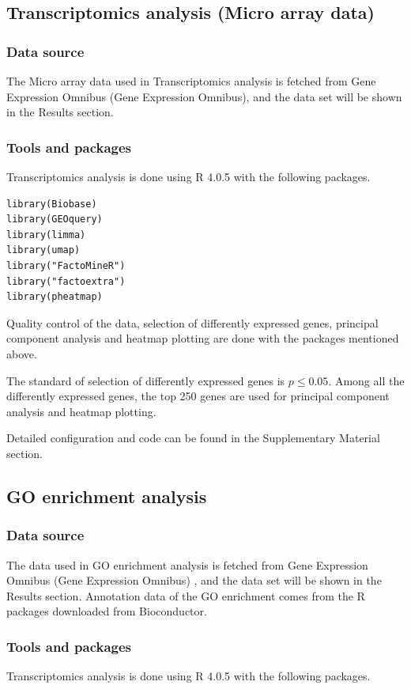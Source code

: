 \subsection{Transcriptomics analysis (Micro array data)}
\subsubsection{Data source}
The Micro array data used in Transcriptomics analysis is fetched from Gene Expression Omnibus (Gene Expression Omnibus), and the data set will be shown in the Results section.

\subsubsection{Tools and packages}
Transcriptomics analysis is done using R 4.0.5 with the following packages.

\begin{lstlisting}
library(Biobase)
library(GEOquery)
library(limma)
library(umap)
library("FactoMineR")
library("factoextra")
library(pheatmap)
\end{lstlisting}

Quality control of the data, selection of differently expressed genes, principal component analysis and heatmap plotting are done with the packages mentioned above. 

The standard of selection of differently expressed genes is $p\le 0.05$. Among all the differently expressed genes, the top 250 genes are used for principal component analysis and heatmap plotting.

Detailed configuration and code can be found in the Supplementary Material section.

\subsection{GO enrichment analysis}
\subsubsection{Data source}
The data used in GO enrichment analysis is fetched from Gene Expression Omnibus (Gene Expression Omnibus) , and the data set will be shown in the Results section. Annotation data of the GO enrichment comes from the R packages downloaded from Bioconductor\cite{gentleman2004bioconductor}.
\subsubsection{Tools and packages}
Transcriptomics analysis is done using R 4.0.5 with the following packages.

